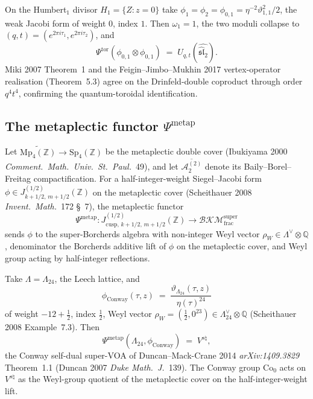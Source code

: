 \begin{example}
\label{ex:psi-tor-sl2}
On the Humbert$_1$ divisor $H_1 = \{Z : z = 0\}$ take
$\phi_1 = \phi_2 = \phi_{0,1} = \eta^{-2}\vartheta_{1,1}^2 / 2$,
the weak Jacobi form of weight $0$, index $1$. Then
$\omega_1 = 1$, the two moduli collapse to
$(q, t) = (e^{2\pi i\tau_1}, e^{2\pi i \tau_2})$, and
\[
\Psi^{\mathrm{tor}}(\phi_{0,1}\otimes\phi_{0,1})
\;=\; U_{q, t}(\widehat{\widehat{\mathfrak{sl}}_2}).
\]
Miki 2007 Theorem~1 and the Feigin--Jimbo--Mukhin 2017
vertex-operator realisation (Theorem~5.3) agree on the
Drinfeld-double coproduct through order $q^4 t^4$, confirming
the quantum-toroidal identification.
\end{example}

\subsection{The metaplectic functor \texorpdfstring{$\Psi^{\mathrm{metap}}$}{Psi-metap}}
\label{subsec:psi-metap}

\begin{definition}
\label{def:psi-metap}
Let $\widetilde{\mathrm{Mp}_4(\mathbb Z)}
\to \mathrm{Sp}_4(\mathbb Z)$ be the metaplectic double cover
(Ibukiyama 2000 \textit{Comment.~Math.~Univ.~St.~Paul.}~49),
and let $\overline{\mathcal A_2^{(2)}}$ denote its
Baily--Borel--Freitag compactification. For a half-integer-weight
Siegel--Jacobi form
$\phi \in J_{k + 1/2,\, m + 1/2}^{(1/2)}(\mathbb Z)$
on the metaplectic cover (Scheithauer 2008
\textit{Invent.~Math.}~172 \S~7), the metaplectic functor
\[
\Psi^{\mathrm{metap}} :
J^{(1/2)}_{\mathrm{cusp},\,k+1/2,\,m+1/2}(\mathbb Z)
\longrightarrow \mathcal{BKM}^{\mathrm{super}}_{\mathrm{frac}}
\]
sends $\phi$ to the super-Borcherds algebra with non-integer
Weyl vector $\rho_W \in \Lambda^\vee\otimes\mathbb Q$, denominator
the Borcherds additive lift of $\phi$ on the metaplectic cover,
and Weyl group acting by half-integer reflections.
\end{definition}

\begin{example}
\label{ex:psi-metap-conway}
Take $\Lambda = \Lambda_{24}$, the Leech lattice, and
\[
\phi_{\mathrm{Conway}}(\tau, z) \;=\;
\frac{\vartheta_{\Lambda_{24}}(\tau, z)}{\eta(\tau)^{24}}
\]
of weight $-12 + \tfrac{1}{2}$, index $\tfrac{1}{2}$, Weyl
vector $\rho_W = (\tfrac{1}{2}, 0^{23}) \in
\Lambda_{24}^\vee\otimes\mathbb Q$ (Scheithauer 2008 Example~7.3).
Then
\[
\Psi^{\mathrm{metap}}(\Lambda_{24}, \phi_{\mathrm{Conway}})
\;=\; V^{s\natural},
\]
the Conway self-dual super-VOA of Duncan--Mack-Crane 2014
\textit{arXiv:1409.3829} Theorem~1.1 (Duncan 2007
\textit{Duke Math.~J.}~139). The Conway group $\mathrm{Co}_0$
acts on $V^{s\natural}$ as the Weyl-group quotient of the
metaplectic cover on the half-integer-weight lift.
\end{example}

